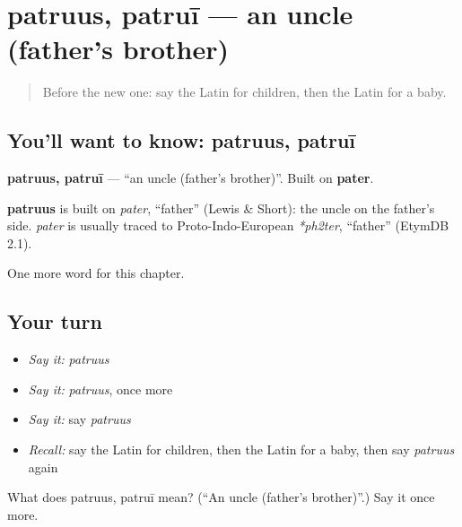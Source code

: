 \section[patruus, patruī]{patruus, patruī — an uncle (father's brother)}

\label{lesson:LA-C71-patruus}



\begin{quote}
Before the new one: say the Latin for children, then the Latin for a baby.
\end{quote}

\subsection*{You'll want to know: patruus, patruī}
\textbf{patruus, patruī} — \textquotedblleft{}an uncle (father's brother)\textquotedblright{}. Built on \textbf{pater}.

\begin{cousinweb}
\textbf{patruus} is built on \emph{pater}, \textquotedblleft{}father\textquotedblright{} (Lewis \& Short): the uncle on the father's side. \emph{pater} is usually traced to Proto-Indo-European \emph{*ph2ter}, \textquotedblleft{}father\textquotedblright{} (EtymDB 2.1).
\end{cousinweb}

\begin{grammarlens}[title={What you've built}]
One more word for this chapter.
\end{grammarlens}

\subsection*{Your turn}
\begin{itemize}
\raggedright
  \item \emph{Say it:} \emph{patruus}
  \item \emph{Say it:} \emph{patruus}, once more
  \item \emph{Say it:} say \emph{patruus}
  \item \emph{Recall:} say the Latin for children, then the Latin for a baby, then say \emph{patruus} again
\end{itemize}

\begin{tcolorbox}[breakable,colback=teal!4,colframe=teal!35!black,title={Before you move on}]
What does patruus, patruī mean? (\textquotedblleft{}An uncle (father's brother)\textquotedblright{}.) Say it once more.
\end{tcolorbox}
